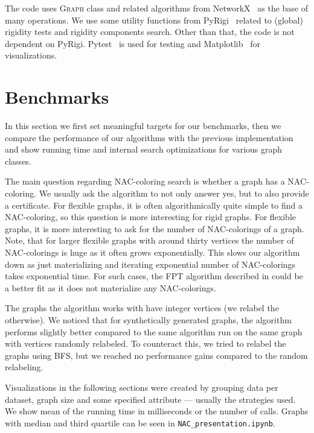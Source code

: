 The code uses \textsc{Graph} class and related algorithms from NetworkX~\cite{networkx}
as the base of many operations. We use some utility functions from PyRigi~\cite{pyrigi}
related to (global) rigidity tests and rigidity components search.
Other than that, the code is not dependent on PyRigi.
%
Pytest~\cite{pytest} is used for testing and
Matplotlib~\cite{matplotlib} for visualizations.


\section{Benchmarks}

In this section we first set meaningful targets for our benchmarks,
then we compare the performance of our algorithms with the previous implementation
and show running time and internal search optimizations for various graph classes.

The main question regarding NAC-coloring search is whether a graph has a NAC-coloring.
We usually ask the algorithm to not only answer yes, but to also provide a certificate.
%
For flexible graphs, it is often algorithmically quite simple to find a NAC-coloring,
so this question is more interesting for rigid graphs.
%
For flexible graphs, it is more interesting to ask for the number of NAC-colorings
of a graph.
Note, that for larger flexible graphs with around thirty vertices
the number of NAC-colorings is huge as it often grows exponentially.
This slows our algorithm down as just materializing and iterating exponential
number of NAC-colorings takes exponential time.
%
For such cases, the FPT algorithm described in 
could be a better fit as it does not materialize any NAC-colorings.

The graphs the algorithm works with have integer vertices (we relabel the otherwise).
We noticed that for synthetically generated graphs,
the algorithm performs slightly better compared to
the same algorithm run on the same graph with vertices randomly relabeled.
To counteract this, we tried to relabel the graphs using BFS,
but we reached no performance gains compared to the random relabeling.

Visualizations in the following sections were created by grouping data per dataset,
graph size and some specified attribute --- usually the strategies used.
%
We show mean of the running time in milliseconds or
the number of \IsNACColoring{} calls.
%
Graphs with median and third quartile can be seen in \texttt{NAC\_presentation.ipynb}.


